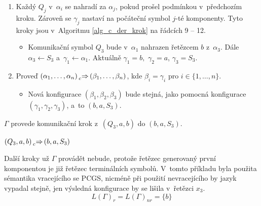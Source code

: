 \begin{example}
\begin{enumerate}
\begin{itemize}[label=$\circ$]
        \end{itemize}
        \item Každý $Q_j$ v~$\alpha_i$ se nahradí za $\alpha_j$, pokud prošel podmínkou v~předchozím kroku.
        Zároveň se $\gamma_j$ nastaví na počáteční symbol $j$-té komponenty.
        Tyto kroky jsou v~Algoritmu \ref{alg_c_der_krok} na řádcích 9 -- 12.
        \begin{itemize}[label=$\circ$]
            \item Komunikační symbol $Q_3$ bude v~$\alpha_1$ nahrazen řetězcem $b$ z~$\alpha_3$. Dále $\alpha_3 \gets S_3$ a~$\gamma_1 \gets \alpha_1$.
            Aktuálně $\gamma_1 = b,$ $\gamma_2 = a$, $\gamma_3 = S_3$. 
        \end{itemize}
        \item Proveď $(\alpha_1, \ldots, \alpha_n) \prescript{}{c}{\Rightarrow}\, (\beta_1, \ldots, \beta_n)$, kde $\beta_i = \gamma_i$ pro $i \in \{1, \ldots, n\}$.
        \begin{itemize}[label=$\circ$]
            \item Nová konfigurace $(\beta_1, \beta_2, \beta_3)$ bude stejná, jako pomocná konfigurace $(\gamma_1, \gamma_2, \gamma_3)$, a~to $(b, a, S_3)$.
        \end{itemize}
    \end{enumerate}
    $\Gamma$ provede komunikační krok z~$(Q_3, a, b)$ do $(b, a, S_3)$.
    \begin{center}
        $(Q_3, a, b) \prescript{}{c}{\Rightarrow}\, (b, a, S_3)$
    \end{center}
    Další kroky už $\Gamma$ provádět nebude, protože řetězec generovaný první komponentou je již řetězec terminálních symbolů.
    V~tomto příkladu byla použita sémantika vracejícího se PCGS, nicméně při použití nevracejícího by jazyk vypadal stejně, jen výsledná konfigurace by se lišila v~řetězci $x_3$.
    \begin{equation*}
        L(\Gamma)_r = L(\Gamma)_{nr} = \{b\}
    \end{equation*}
\end{example}

